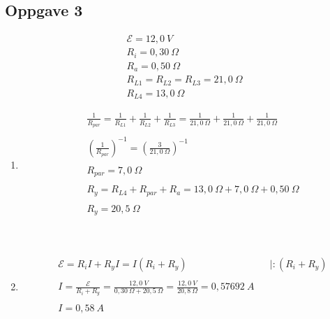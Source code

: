 \documentclass[11pt,a4paper]{report}
\newcommand{\opg}[1]{\subsection*{Oppgave #1}}
\newcommand{\opgd}[1]{\item[#1)]}
\begin{document}
\opg{3}
\begin{align*}
&\mathcal{E} = 12,0\ V\\
&R_i = 0,30\ \Omega\\
&R_a = 0,50\ \Omega\\
&R_{L1} = R_{L2} = R_{L3} = 21,0\ \Omega\\
&R_{L4} = 13,0\ \Omega
\end{align*}
\begin{enumerate}[leftmargin=*,itemsep=2cm,labelsep=2em,label=\alph*)]
\opgd{a}
\begin{align*}
&\frac{1}{R_{par}} = \frac{1}{R_{L1}} + \frac{1}{R_{L2}} + \frac{1}{R_{L3}} = \frac{1}{21,0\ \Omega} + \frac{1}{21,0\ \Omega} + \frac{1}{21,0\ \Omega}\\\\
&\left( \frac{1}{R_{par}} \right)^{-1} = \left( \frac{3}{21,0\ \Omega} \right)^{-1}\\\\
&R_{par} = 7,0\ \Omega\\\\
&R_y = R_{L4} + R_{par} + R_a = 13,0\ \Omega + 7,0\ \Omega + 0,50\ \Omega\\\\
&R_y = 20,5\ \Omega\\
\end{align*}

\\


\opgd{b}
\begin{align*}
&\mathcal{E} = R_i I + R_y I = I ( R_i + R_y ) &&| : (R_i + R_y)\\\\
&I = \frac{\mathcal{E}}{R_i + R_y} = \frac{12,0\ V}{0,30\ \Omega + 20,5\ \Omega} = \frac{12,0\ V}{20,8\ \Omega} = 0,57692\ A\\\\
&I = 0,58\ A\\
\end{align*}


\end{enumerate}

\newpage
\end{document}
